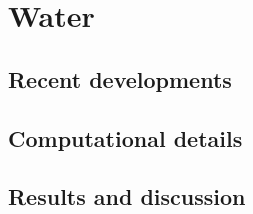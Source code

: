 \chapter{Water}
\label{chap:h2o}
\section{Recent developments}
\section{Computational details}
\section{Results and discussion}
